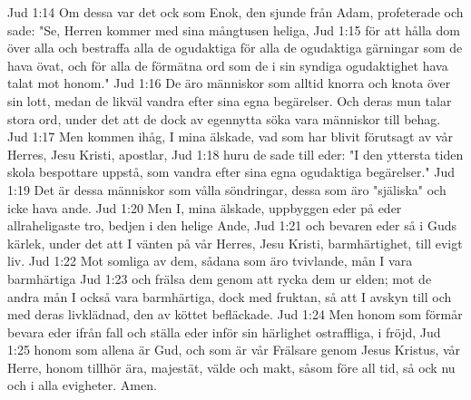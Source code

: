 Jud 1:14  Om dessa var det ock som Enok, den sjunde från Adam, profeterade och sade: "Se, Herren kommer med sina mångtusen heliga,
Jud 1:15  för att hålla dom över alla och bestraffa alla de ogudaktiga för alla de ogudaktiga gärningar som de hava övat, och för alla de förmätna ord som de i sin syndiga ogudaktighet hava talat mot honom."
Jud 1:16  De äro människor som alltid knorra och knota över sin lott, medan de likväl vandra efter sina egna begärelser. Och deras mun talar stora ord, under det att de dock av egennytta söka vara människor till behag.
Jud 1:17  Men kommen ihåg, I mina älskade, vad som har blivit förutsagt av vår Herres, Jesu Kristi, apostlar,
Jud 1:18  huru de sade till eder: "I den yttersta tiden skola bespottare uppstå, som vandra efter sina egna ogudaktiga begärelser."
Jud 1:19  Det är dessa människor som vålla söndringar, dessa som äro "själiska" och icke hava ande.
Jud 1:20  Men I, mina älskade, uppbyggen eder på eder allraheligaste tro, bedjen i den helige Ande,
Jud 1:21  och bevaren eder så i Guds kärlek, under det att I vänten på vår Herres, Jesu Kristi, barmhärtighet, till evigt liv.
Jud 1:22  Mot somliga av dem, sådana som äro tvivlande, mån I vara barmhärtiga
Jud 1:23  och frälsa dem genom att rycka dem ur elden; mot de andra mån I också vara barmhärtiga, dock med fruktan, så att I avskyn till och med deras livklädnad, den av köttet befläckade.
Jud 1:24  Men honom som förmår bevara eder ifrån fall och ställa eder inför sin härlighet ostraffliga, i fröjd,
Jud 1:25  honom som allena är Gud, och som är vår Frälsare genom Jesus Kristus, vår Herre, honom tillhör ära, majestät, välde och makt, såsom före all tid, så ock nu och i alla evigheter. Amen.


